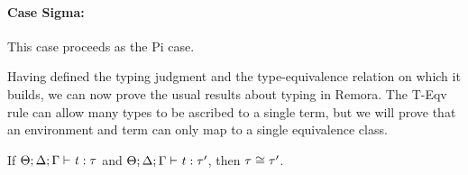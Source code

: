 \begin{sproof}
  \paragraph{Case {\sc Sigma}:}
  This case proceeds as the {\sc Pi} case.
\end{sproof}

Having defined the typing judgment
and the type-equivalence relation on which it builds,
we can now prove the usual results about typing in Remora.
The {\sc T-Eqv} rule can allow many types to be ascribed to a single term,
but we will prove that an environment and term
can only map to a single equivalence class.

\begin{theorem}
  \label{UniqType}
  If $\Theta;\Delta;\Gamma \vdash \mathit{t} : \mathit{\tau}$
  and $\Theta;\Delta;\Gamma \vdash \mathit{t} : \mathit{\tau}'$,
  then $\mathit{\tau} \cong \mathit{\tau}'$.
\end{theorem}
